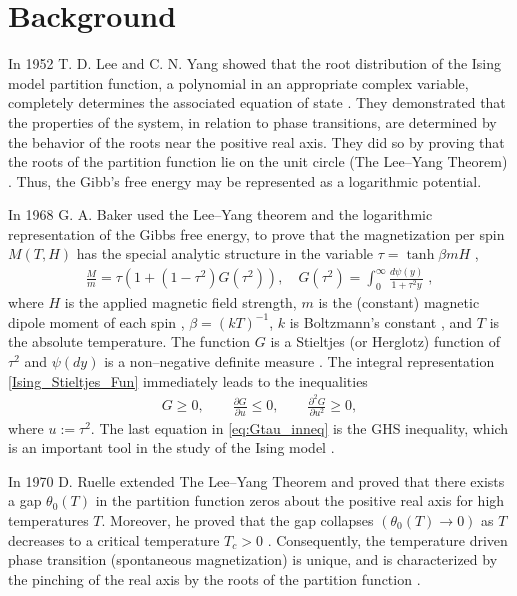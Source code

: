 \documentclass[english,12pt,jmp,graphicx]{revtex4-1}
\begin{document}
\section{Background}\label{sec:Background}
%
In 1952 T. D. Lee and C. N. Yang showed that the root distribution of
the Ising model partition function, a polynomial in an appropriate
complex variable, completely determines the associated equation of
state \cite{Yang:PR:404}. They demonstrated that the properties
of the system, in relation to phase transitions, are determined by the
behavior of the roots near the positive real axis. They did so by
proving that the roots of the partition function lie on the unit circle
(The Lee--Yang Theorem) \cite{Lee:PR:411,Ruelle-1969}. Thus, the Gibb's
free energy may be represented as a logarithmic potential.

In 1968 G. A. Baker used the
Lee--Yang theorem and the logarithmic representation of the Gibbs free
energy, to prove that the magnetization per spin $M(T,H)$
has the special analytic structure in the variable $\tau=\tanh{\beta mH}$
\cite{Baker:PRL-990}, 
%
\begin{align}\label{Ising_Stieltjes_Fun}
  \frac{M}{m} =\tau(1+(1-\tau^2)G(\tau^2)), \quad
  G(\tau^2)=\int_0^\infty\frac{d\psi(y)}{1+\tau^2y}\;, %
\end{align}
%
where $H$ is the applied magnetic field strength, $m$ is the
(constant) magnetic dipole moment of each spin \cite{Griffiths-1999},
$\beta=(kT)^{-1}$, $k$ is Boltzmann's constant \cite{Thompson-1988}, and
$T$ is the absolute temperature. The function $G$ is a Stieltjes (or
Herglotz) function of $\tau^2$ and $\psi(dy)$ is a non--negative definite
measure \cite{Baker:PRL-990}.  The integral representation
\eqref{Ising_Stieltjes_Fun} immediately leads to the inequalities   
%
\begin{align}\label{eq:Gtau_inneq}
  G\geq0, \qquad \frac{\partial G}{\partial u}\leq0, \qquad \frac{\partial^2G}{\partial u^2}\geq0,
\end{align}
%
where $u:=\tau^2$. The last equation in \eqref{eq:Gtau_inneq} is the GHS
inequality, which is an important tool in the study of the Ising model
\cite{Golden:JMP-5627}. 

In 1970 D. Ruelle extended The Lee--Yang Theorem and proved that
there exists a gap $\theta_0(T)$ in the partition function zeros about the
positive real axis for high temperatures $T$. Moreover, he proved that
the gap collapses $(\theta_0(T)\to0)$ as $T$ decreases to a critical
temperature $T_c>0$ \cite{Ruelle:PRL:303}. Consequently, the
temperature driven phase transition (spontaneous magnetization) is
unique, and is characterized by the pinching of the real axis by the
roots of the partition function \cite{Ruelle-1969,Ruelle:AM:589}. 
\end{document}
